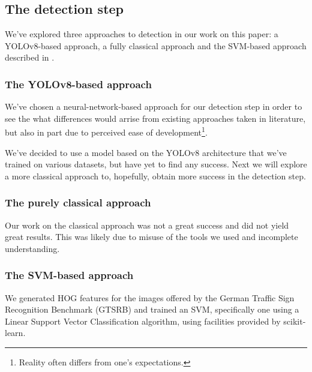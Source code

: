 \documentclass[conference]{IEEEtran}
\begin{document}
\subsection{The detection step}

We've explored three approaches to detection in our work on this paper: a YOLOv8-based approach,
a fully classical approach and the SVM-based approach described in \cite{svm_paper}.

\subsubsection*{The YOLOv8-based approach}
We've chosen a neural-network-based approach for our detection step in order to see the
what differences would arrise from existing approaches taken in literature, but also in
part due to perceived ease of development\footnote{Reality often differs from one's
expectations.}.

We've decided to use a model based on the YOLOv8 architecture that we've trained on various
datasets, but have yet to find any success. Next we will explore a more classical approach
to, hopefully, obtain more success in the detection step.


\subsubsection*{The purely classical approach}
Our work on the classical approach was not a great success and did not yield great results.
This was likely due to misuse of the tools we used and incomplete understanding.

\subsubsection*{The SVM-based approach}
We generated HOG features for the images offered by the German Traffic Sign Recognition
Benchmark (GTSRB)\cite{Houben-IJCNN-2013} and trained an SVM, specifically one using a Linear
Support Vector Classification algorithm, using facilities provided by scikit-learn\cite{scikit-learn}.
\end{document}
